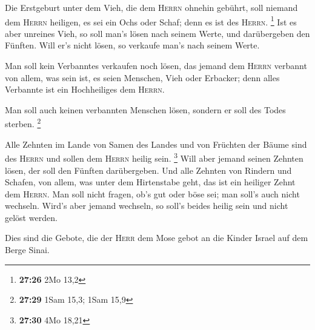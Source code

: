  Die Erstgeburt unter dem Vieh, die dem \textsc{Herrn}
ohnehin gebührt, soll niemand dem \textsc{Herrn} heiligen, es sei ein
Ochs oder Schaf; denn es ist des \textsc{Herrn}. \footnote{\textbf{27:26}
  2Mo 13,2}  Ist es aber unreines Vieh, so soll man's
lösen nach seinem Werte, und darübergeben den Fünften. Will er's nicht
lösen, so verkaufe man's nach seinem Werte.

 Man soll kein Verbanntes verkaufen noch lösen, das
jemand dem \textsc{Herrn} verbannt von allem, was sein ist, es seien
Menschen, Vieh oder Erbacker; denn alles Verbannte ist ein Hochheiliges
dem \textsc{Herrn}.

 Man soll auch keinen verbannten Menschen lösen, sondern
er soll des Todes sterben. \footnote{\textbf{27:29} 1Sam 15,3; 1Sam 15,9}

 Alle Zehnten im Lande von Samen des Landes und von
Früchten der Bäume sind des \textsc{Herrn} und sollen dem \textsc{Herrn}
heilig sein. \footnote{\textbf{27:30} 4Mo 18,21}  Will
aber jemand seinen Zehnten lösen, der soll den Fünften darübergeben.
 Und alle Zehnten von Rindern und Schafen, von allem, was
unter dem Hirtenstabe geht, das ist ein heiliger Zehnt dem
\textsc{Herrn}.  Man soll nicht fragen, ob's gut oder
böse sei; man soll's auch nicht wechseln. Wird's aber jemand wechseln,
so soll's beides heilig sein und nicht gelöst werden.

 Dies sind die Gebote, die der \textsc{Herr} dem Mose
gebot an die Kinder Israel auf dem Berge Sinai.

